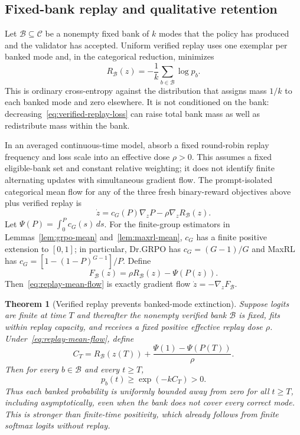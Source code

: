 \documentclass{article}
\newcommand{\1}{\mathbf 1}
\newtheorem{theorem}[lemma]{Theorem}
\theoremstyle{remark}
\theoremstyle{definition}
\theoremstyle{plain}
\begin{document}
\subsection{Fixed-bank replay and qualitative retention}
\label{app:theory-replay}

Let $\mathcal B\subseteq\mathcal C$ be a nonempty fixed bank of $k$ modes that
the policy has produced and the validator has accepted. Uniform verified replay
uses one exemplar per banked mode and, in the categorical reduction, minimizes
\begin{equation}
  R_{\mathcal B}(z)
  =-\frac1k\sum_{b\in\mathcal B}\log p_b.
  \label{eq:verified-replay-loss}
\end{equation}
This is ordinary cross-entropy against the distribution that assigns mass
$1/k$ to each banked mode and zero elsewhere. It is not conditioned on the
bank: decreasing~\eqref{eq:verified-replay-loss} can raise total bank mass as
well as redistribute mass within the bank.

In an averaged continuous-time model, absorb a fixed round-robin replay
frequency and loss scale into an effective dose $\rho>0$. This assumes a
fixed eligible-bank set and constant relative weighting; it does not identify
finite alternating updates with simultaneous gradient flow. The prompt-isolated categorical mean flow for any of the three fresh
binary-reward objectives above plus verified replay is
\begin{equation}
  \dot z
  =c_G(P)\nabla_zP-\rho\nabla_zR_{\mathcal B}(z).
  \label{eq:replay-mean-flow}
\end{equation}
Let $\Psi(P)=\int_0^P c_G(s)\,ds$. For the finite-group estimators in Lemmas~\ref{lem:grpo-mean}
and~\ref{lem:maxrl-mean}, $c_G$ has a finite positive extension to $[0,1]$;
in particular, Dr.GRPO has $c_G=(G-1)/G$ and MaxRL has
$c_G=[1-(1-P)^{G-1}]/P$. Define
\begin{equation}
  F_{\mathcal B}(z)=\rho R_{\mathcal B}(z)-\Psi(P(z)).
  \label{eq:replay-potential}
\end{equation}
Then~\eqref{eq:replay-mean-flow} is exactly gradient flow
$\dot z=-\nabla_zF_{\mathcal B}$.

\begin{theorem}[Verified replay prevents banked-mode extinction]
\label{thm:replay-retention}
Suppose logits are finite at time $T$ and thereafter the nonempty verified
bank $\mathcal B$ is fixed, fits within replay capacity, and receives a
fixed positive effective replay dose $\rho$. Under~\eqref{eq:replay-mean-flow}, define
\[
  C_T
  =R_{\mathcal B}(z(T))
   +\frac{\Psi(1)-\Psi(P(T))}{\rho}.
\]
Then for every $b\in\mathcal B$ and every $t\ge T$,
\begin{equation}
  p_b(t)\ge \exp(-kC_T)>0.
  \label{eq:replay-retention-bound}
\end{equation}
Thus each banked probability is uniformly bounded away from zero for all
$t\ge T$, including asymptotically, even when the bank does not cover every
correct mode. This is stronger than finite-time positivity, which already
follows from finite softmax logits without replay.
\end{theorem}
\end{document}
